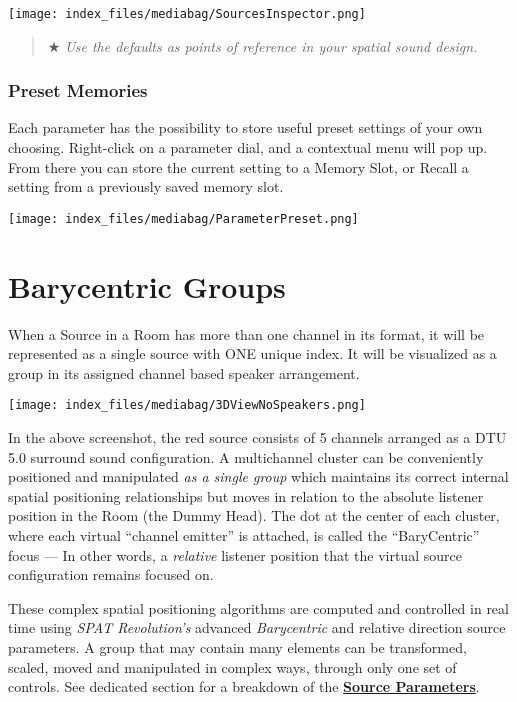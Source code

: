 \documentclass[
  letterpaper,
  DIV=11,
  numbers=noendperiod]{scrreport}
\begin{document}
\texttt{[image: index\_files/mediabag/SourcesInspector.png]}

\begin{quote}
★ \emph{Use the defaults as points of reference in your spatial sound
design.}
\end{quote}

\hypertarget{preset-memories}{%
\subsection{Preset Memories}\label{preset-memories}}

Each parameter has the possibility to store useful preset settings of
your own choosing. Right-click on a parameter dial, and a contextual
menu will pop up. From there you can store the current setting to a
Memory Slot, or Recall a setting from a previously saved memory slot.

\texttt{[image: index\_files/mediabag/ParameterPreset.png]}

\hypertarget{barycentric-groups}{%
\chapter{Barycentric Groups}\label{barycentric-groups}}

When a Source in a Room has more than one channel in its format, it will
be represented as a single source with ONE unique index. It will be
visualized as a group in its assigned channel based speaker arrangement.

\texttt{[image: index\_files/mediabag/3DViewNoSpeakers.png]}

In the above screenshot, the red source consists of 5 channels arranged
as a DTU 5.0 surround sound configuration. A multichannel cluster can be
conveniently positioned and manipulated \emph{as a single group} which
maintains its correct internal spatial positioning relationships but
moves in relation to the absolute listener position in the Room (the
Dummy Head). The dot at the center of each cluster, where each virtual
``channel emitter'' is attached, is called the ``BaryCentric'' focus ---
In other words, a \emph{relative} listener position that the virtual
source configuration remains focused on.

These complex spatial positioning algorithms are computed and controlled
in real time using \emph{SPAT Revolution's} advanced \emph{Barycentric}
and relative direction source parameters. A group that may contain many
elements can be transformed, scaled, moved and manipulated in complex
ways, through only one set of controls. See dedicated section for a
breakdown of the
\href{Spat_Environment_Source_Parameters.md}{\textbf{Source
Parameters}}.
\end{document}
